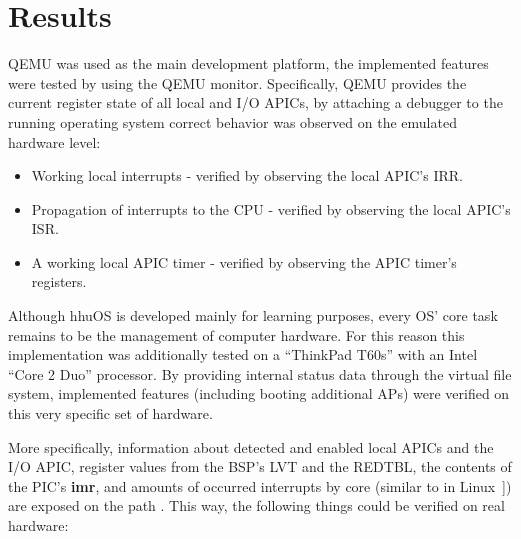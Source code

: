 \section{Results}
\label{sec:verificationresults}

QEMU was used as the main development platform, the implemented features were tested by using the
QEMU monitor. Specifically, QEMU provides the current register state of all local and I/O APICs, by
attaching a debugger to the running operating system correct behavior was observed on the emulated
hardware level:

\begin{itemize}
  \item Working local interrupts - verified by observing the local APIC's IRR\@.
  \item Propagation of interrupts to the CPU - verified by observing the local APIC's ISR\@.
  \item A working local APIC timer - verified by observing the APIC timer's registers.
\end{itemize}

Although hhuOS is developed mainly for learning purposes, every OS' core task remains to be the
management of computer hardware. For this reason this implementation was additionally tested on a
``ThinkPad T60s'' with an Intel ``Core 2 Duo'' processor. By providing internal status data through
the virtual file system, implemented features (including booting additional APs) were verified on
this very specific set of hardware.

More specifically, information about detected and enabled local APICs and the I/O APIC, register
values from the BSP's LVT and the REDTBL, the contents of the PIC's \textbf{\gls{imr}}, and amounts
of occurred interrupts by core (similar to  in Linux~\cite{linux}]) are
exposed on the path . This way, the following things could be verified on real
hardware:

